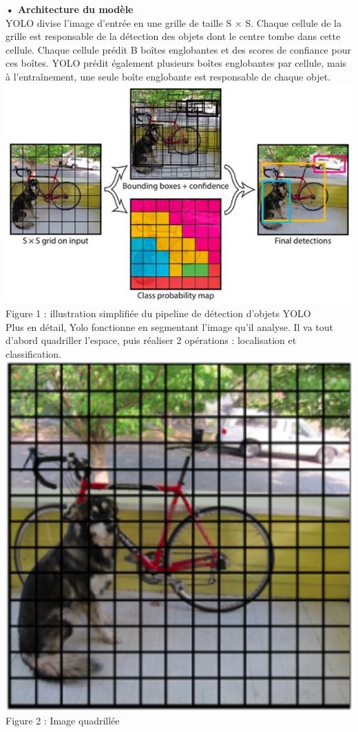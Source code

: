 \documentclass[a4paper, 13px]{article}
\begin{document}
{\bfseries {•	Architecture du modèle }}\\
YOLO divise l'image d'entrée en une grille de taille S × S. Chaque cellule de la grille est responsable de la détection des objets dont le centre tombe dans cette cellule. Chaque cellule prédit B boîtes englobantes et des scores de confiance pour ces boîtes. YOLO prédit également plusieurs boîtes englobantes par cellule, mais à l'entraînement, une seule boîte englobante est responsable de chaque objet.\\
 \includegraphics[scale=0.7]{img2.png}\\
Figure 1 : illustration simplifiée du pipeline de détection d’objets YOLO\\

Plus en détail, 
Yolo fonctionne en segmentant l’image qu’il analyse. Il va tout d’abord quadriller l’espace, puis réaliser 2 opérations : localisation et classification.
\\
 \includegraphics[scale=0.5]{img3.png}\\
 Figure 2 :  Image quadrillée\\
 
\end{document}

